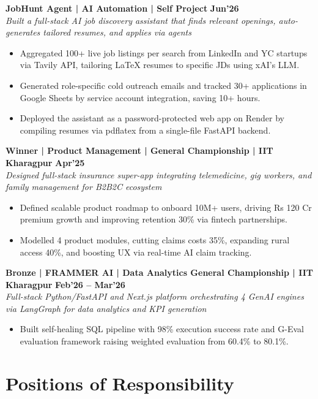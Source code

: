 \documentclass[10pt, a4paper]{article}
\newenvironment{achievelist}{
  \begin{itemize}[leftmargin=1.2em, itemsep=0.5pt, parsep=0pt, topsep=1pt]
    \small
}{
  \end{itemize}
  \vspace{-2pt}
}
\newcommand{\achieve}[1]{\item #1}
\begin{document}
\textbf{JobHunt Agent | AI Automation | Self Project} \hfill \textbf{\small Jun'26} \\
\textit{\small Built a full-stack AI job discovery assistant that finds relevant openings, auto-generates tailored resumes, and applies via agents}
\begin{achievelist}
  \achieve{Aggregated 100+ live job listings per search from LinkedIn and YC startups via Tavily API, tailoring LaTeX resumes to specific JDs using xAI's LLM.}
  \achieve{Generated role-specific cold outreach emails and tracked 30+ applications in Google Sheets by service account integration, saving 10+ hours.}
  \achieve{Deployed the assistant as a password-protected web app on Render by compiling resumes via pdflatex from a single-file FastAPI backend.}
\end{achievelist}

\textbf{Winner | Product Management | General Championship | IIT Kharagpur} \hfill \textbf{\small Apr'25} \\
\textit{\small Designed full-stack insurance super-app integrating telemedicine, gig workers, and family management for B2B2C ecosystem}
\begin{achievelist}
  \achieve{Defined scalable product roadmap to onboard 10M+ users, driving Rs 120 Cr premium growth and improving retention 30\% via fintech partnerships.}
  \achieve{Modelled 4 product modules, cutting claims costs 35\%, expanding rural access 40\%, and boosting UX via real-time AI claim tracking.}
\end{achievelist}

\textbf{Bronze | FRAMMER AI | Data Analytics General Championship | IIT Kharagpur} \hfill \textbf{\small Feb'26 -- Mar'26} \\
\textit{\small Full-stack Python/FastAPI and Next.js platform orchestrating 4 GenAI engines via LangGraph for data analytics and KPI generation}
\begin{achievelist}
  \achieve{Built self-healing SQL pipeline with 98\% execution success rate and G-Eval evaluation framework raising weighted evaluation from 60.4\% to 80.1\%.}
\end{achievelist}

\vspace{-2pt}

\section{Positions of Responsibility}
\end{document}
